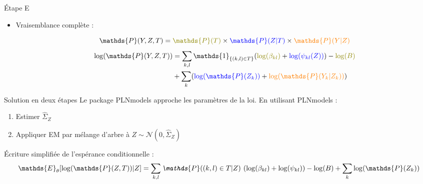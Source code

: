 \documentclass[11pt]{bredelebeamer}
\begin{document}
\begin{frame}{\'{E}tape E}

\begin{itemize}
    \item Vraisemblance complète :

 \[ \mathds{P}(Y,Z,T) = \color{olive}\mathds{P}(T)\color{black}\times\color{blue}\mathds{P}(Z|T)\color{black}\times\color{orange}\mathds{P}(Y|Z)\]
\begin{align*}
 \log(\mathds{P}(Y,Z,T)) &= \sum_{k,l} \mathds{1}_{\{(k,l) \in T\}} (\color{olive}\log(\beta_{kl})\color{black} + \color{blue}\log(\psi_{kl}(Z)) \color{black})-\color{olive}\log(B)\color{black} \\
 &+\sum_k (\color{blue} \log(\mathds{P}(Z_k))\color{black} + \color{orange}\log(\mathds{P}(Y_k|Z_k))\color{black})
 \end{align*}

\end{itemize}
    
\end{frame}
\begin{frame}{Solution en deux étapes}
    Le package {\selectfont
PLNmodels} approche les paramètres de la loi. En utilisant {\selectfont
PLNmodels} :
    \vspace{0.3cm}
    \begin{enumerate}
        \item Estimer $\hat{\Sigma}_Z$ \vspace{0.2cm}
        \item Appliquer EM par mélange d'arbre à $Z \sim \mathcal{N}(0,\hat{\Sigma}_Z)$\\
    \end{enumerate}
\vspace{1.5cm}
\'{E}criture simplifiée de l'espérance conditionnelle :\\
\vspace{0.2cm}
\[\mathds{E}_\theta[\log(\mathds{P}(Z,T))|Z] =\sum_{k,l}  \emph{$\mathds{P}((k,l) \in T|Z)$ }(\log(\beta_{kl}) + \log(\psi_{kl}) )-\log(B) +\sum_k \log(\mathds{P}(Z_k))\]
\end{frame}
\end{document}
